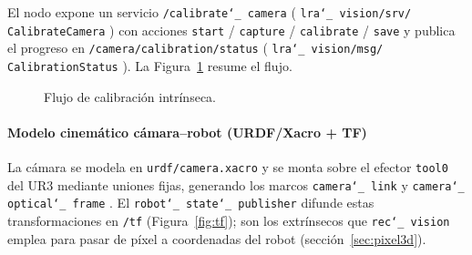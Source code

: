 \documentclass[12pt,a4paper]{article}
\newcommand{\code}[1]{%
  \begingroup
  \def\_{\char`_\penalty0 }%
  \def\/{\char`/\penalty0 }%
  \texttt{\small #1}%
  \endgroup}
\begin{document}
\begin{sloppypar}
El nodo expone un servicio \code{/calibrate\_camera}
(\code{lra\_vision/srv/ CalibrateCamera}) con acciones
\code{start}\slash\code{capture}\slash\code{calibrate}\slash\code{save} y publica el progreso en
\code{/camera/calibration/status} (\code{lra\_vision/msg/ CalibrationStatus}). La Figura~\ref{fig:calib-flujo} resume el flujo.
\end{sloppypar}

\begin{figure}[H]
\centering
{}
\caption{Flujo de calibración intrínseca.}
\label{fig:calib-flujo}
\end{figure}

\paragraph{Modelo cinemático cámara--robot (URDF/Xacro + TF)}
\label{sec:tf}

La cámara se modela en \code{urdf/camera.xacro} y se monta sobre el efector
\code{tool0} del UR3 mediante uniones fijas, generando los marcos
\code{camera\_link} y \code{camera\_optical\_frame}. El
\code{robot\_state\_publisher} difunde estas transformaciones en \code{/tf}
(Figura~\ref{fig:tf}); son los extrínsecos que \code{rec\_vision}
emplea para pasar de píxel a coordenadas del robot (sección~\ref{sec:pixel3d}).
\end{document}
